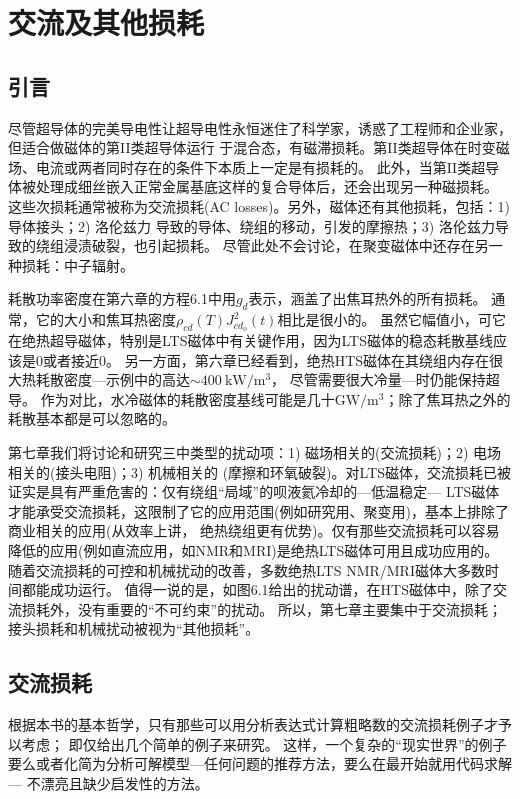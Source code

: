 \chapter{交流及其他损耗}
\section{引言}
尽管超导体的完美导电性让超导电性永恒迷住了科学家，诱惑了工程师和企业家，但适合做磁体的第II类超导体运行
于混合态，有磁滞损耗。第II类超导体在时变磁场、电流或两者同时存在的条件下本质上一定是有损耗的。
此外，当第II类超导体被处理成细丝嵌入正常金属基底这样的复合导体后，还会出现另一种磁损耗。
这些次损耗通常被称为交流损耗(AC losses)。另外，磁体还有其他损耗，包括：1)导体接头；2) 洛伦兹力
导致的导体、绕组的移动，引发的摩擦热；3) 洛伦兹力导致的绕组浸渍破裂，也引起损耗。
尽管此处不会讨论，在聚变磁体中还存在另一种损耗：中子辐射。

耗散功率密度在第六章的方程6.1中用$g_d$表示，涵盖了出焦耳热外的所有损耗。
通常，它的大小和焦耳热密度$\rho_{cd}(T)J_{cd_o}^2(t)$相比是很小的。
虽然它幅值小，可它在绝热超导磁体，特别是LTS磁体中有关键作用，因为LTS磁体的稳态耗散基线应该是0或者接近0。
另一方面，第六章已经看到，绝热HTS磁体在其绕组内存在很大热耗散密度---示例中的高达$\sim 400\ \mathrm{kW/m^3}$，
尽管需要很大冷量---时仍能保持超导。
作为对比，水冷磁体的耗散密度基线可能是几十$\mathrm{GW/m^3}$；除了焦耳热之外的耗散基本都是可以忽略的。

第七章我们将讨论和研究三中类型的扰动项：1) 磁场相关的(交流损耗)；2) 电场相关的(接头电阻)；3) 机械相关的
(摩擦和环氧破裂)。对LTS磁体，交流损耗已被证实是具有严重危害的：仅有绕组“局域”的呗液氦冷却的---低温稳定---
LTS磁体才能承受交流损耗，这限制了它的应用范围(例如研究用、聚变用)，基本上排除了商业相关的应用(从效率上讲，
绝热绕组更有优势)。仅有那些交流损耗可以容易降低的应用(例如直流应用，如NMR和MRI)是绝热LTS磁体可用且成功应用的。
随着交流损耗的可控和机械扰动的改善，多数绝热LTS NMR/MRI磁体大多数时间都能成功运行。
值得一说的是，如图6.1给出的扰动谱，在HTS磁体中，除了交流损耗外，没有重要的“不可约束”的扰动。
所以，第七章主要集中于交流损耗；接头损耗和机械扰动被视为“其他损耗”。

\section{交流损耗}
根据本书的基本哲学，只有那些可以用分析表达式计算粗略数的交流损耗例子才予以考虑；
即仅给出几个简单的例子来研究。
这样，一个复杂的“现实世界”的例子要么或者化简为分析可解模型---任何问题的推荐方法，要么在最开始就用代码求解---
不漂亮且缺少启发性的方法。

